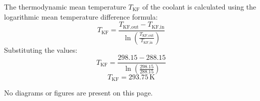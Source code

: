 The thermodynamic mean temperature \( T_{\text{KF}} \) of the coolant is calculated using the logarithmic mean temperature difference formula:  
\[
T_{\text{KF}} = \frac{T_{\text{KF,out}} - T_{\text{KF,in}}}{\ln \left( \frac{T_{\text{KF,out}}}{T_{\text{KF,in}}} \right)}
\]  
Substituting the values:  
\[
T_{\text{KF}} = \frac{298.15 - 288.15}{\ln \left( \frac{298.15}{288.15} \right)}
\]  
\[
T_{\text{KF}} = 293.75 \, \text{K}
\]  

No diagrams or figures are present on this page.